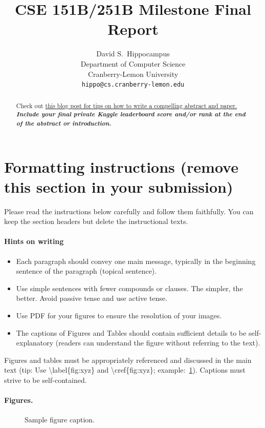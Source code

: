 \documentclass{article}
\title{
CSE 151B/251B Milestone Final Report
\\
}
\author{%
  David S.~Hippocampus
  \\
  Department of Computer Science\\
  Cranberry-Lemon University\\
  \texttt{hippo@cs.cranberry-lemon.edu} \\
}
\begin{document}
\maketitle


\begin{abstract}
Check out \href{https://www.alignmentforum.org/posts/eJGptPbbFPZGLpjsp/highly-opinionated-advice-on-how-to-write-ml-papers#Abstract}{this blog post for tips on how to write a compelling abstract and paper.} \textbf{\textit{Include your final private Kaggle leaderboard score and/or rank at the end of the abstract or introduction.}}
\end{abstract}

\section*{Formatting instructions (remove this section in your submission)}
Please read the instructions below carefully and follow them faithfully. You can keep the section headers but delete the instructional texts.
\paragraph{Hints on writing}
\begin{itemize}
    \item Each paragraph should convey one main message, typically in the beginning sentence of the paragraph (topical sentence).
    \item  Use simple sentences with fewer compounds or clauses. The simpler, the better. Avoid passive tense and use active tense.
    \item Use PDF for your figures to ensure the resolution of your images.
    \item The captions of Figures and Tables should contain sufficient details to be self-explanatory (readers can understand the figure without referring to the text).
\end{itemize}


Figures and tables must be appropriately referenced and discussed in the main text (tip: Use \textbackslash label\{fig:xyz\} and \textbackslash cref\{fig:xyz\}; example:~\cref{fig:example}). Captions must strive to be self-contained.
\paragraph{Figures.}
\begin{figure} %
  \vspace{-4mm}  %
  \centering
  \fbox{\rule[-.5cm]{0cm}{4cm} \rule[-.5cm]{4cm}{0cm}}
  \caption{Sample figure caption.}
  \label{fig:example}
\end{figure}
\end{document}
